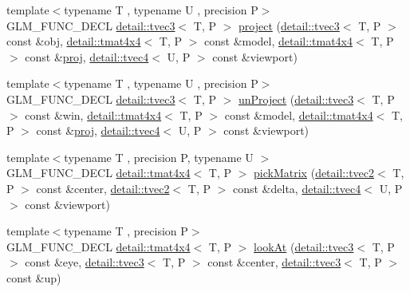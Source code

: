 \begin{DoxyCompactItemize}
\item 
{\footnotesize template$<$typename T , typename U , precision P$>$ }\\G\+L\+M\+\_\+\+F\+U\+N\+C\+\_\+\+D\+E\+CL \hyperlink{structglm_1_1detail_1_1tvec3}{detail\+::tvec3}$<$ T, P $>$ \hyperlink{group__gtc__matrix__transform_ga41227b7b98882dcbaa8dab52df372c7b}{project} (\hyperlink{structglm_1_1detail_1_1tvec3}{detail\+::tvec3}$<$ T, P $>$ const \&obj, \hyperlink{structglm_1_1detail_1_1tmat4x4}{detail\+::tmat4x4}$<$ T, P $>$ const \&model, \hyperlink{structglm_1_1detail_1_1tmat4x4}{detail\+::tmat4x4}$<$ T, P $>$ const \&\hyperlink{group__gtx__projection_gadf29123bcf748fc9d6fb0998192184cf}{proj}, \hyperlink{structglm_1_1detail_1_1tvec4}{detail\+::tvec4}$<$ U, P $>$ const \&viewport)
\item 
{\footnotesize template$<$typename T , typename U , precision P$>$ }\\G\+L\+M\+\_\+\+F\+U\+N\+C\+\_\+\+D\+E\+CL \hyperlink{structglm_1_1detail_1_1tvec3}{detail\+::tvec3}$<$ T, P $>$ \hyperlink{group__gtc__matrix__transform_ga4b0a9086d15e2a743ecd7b6128146af1}{un\+Project} (\hyperlink{structglm_1_1detail_1_1tvec3}{detail\+::tvec3}$<$ T, P $>$ const \&win, \hyperlink{structglm_1_1detail_1_1tmat4x4}{detail\+::tmat4x4}$<$ T, P $>$ const \&model, \hyperlink{structglm_1_1detail_1_1tmat4x4}{detail\+::tmat4x4}$<$ T, P $>$ const \&\hyperlink{group__gtx__projection_gadf29123bcf748fc9d6fb0998192184cf}{proj}, \hyperlink{structglm_1_1detail_1_1tvec4}{detail\+::tvec4}$<$ U, P $>$ const \&viewport)
\item 
{\footnotesize template$<$typename T , precision P, typename U $>$ }\\G\+L\+M\+\_\+\+F\+U\+N\+C\+\_\+\+D\+E\+CL \hyperlink{structglm_1_1detail_1_1tmat4x4}{detail\+::tmat4x4}$<$ T, P $>$ \hyperlink{group__gtc__matrix__transform_ga0fb64f04bf5ad52523fcd4b10b46aff6}{pick\+Matrix} (\hyperlink{structglm_1_1detail_1_1tvec2}{detail\+::tvec2}$<$ T, P $>$ const \&center, \hyperlink{structglm_1_1detail_1_1tvec2}{detail\+::tvec2}$<$ T, P $>$ const \&delta, \hyperlink{structglm_1_1detail_1_1tvec4}{detail\+::tvec4}$<$ U, P $>$ const \&viewport)
\item 
{\footnotesize template$<$typename T , precision P$>$ }\\G\+L\+M\+\_\+\+F\+U\+N\+C\+\_\+\+D\+E\+CL \hyperlink{structglm_1_1detail_1_1tmat4x4}{detail\+::tmat4x4}$<$ T, P $>$ \hyperlink{group__gtc__matrix__transform_ga454fdf3163c2779eeeeeb9d75907ce97}{look\+At} (\hyperlink{structglm_1_1detail_1_1tvec3}{detail\+::tvec3}$<$ T, P $>$ const \&eye, \hyperlink{structglm_1_1detail_1_1tvec3}{detail\+::tvec3}$<$ T, P $>$ const \&center, \hyperlink{structglm_1_1detail_1_1tvec3}{detail\+::tvec3}$<$ T, P $>$ const \&up)

\end{DoxyCompactItemize}
